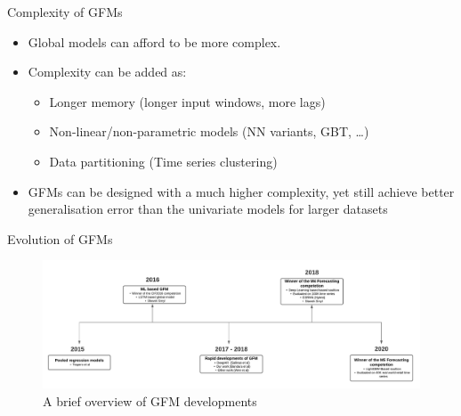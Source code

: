 \documentclass{beamer}
\begin{document}
 \begin{frame}{Complexity of GFMs}
  	\begin{itemize}
  	\item  Global models can afford to be more complex.
  	\vspace{2.0mm}	  
  	\item Complexity can be added as:
  	\begin{itemize}\color{blue}
		\item Longer memory (longer input windows, more lags)
		\item Non-linear/non-parametric models (NN variants, GBT, …)
		\item Data partitioning (Time series clustering)
	  \end{itemize}
	  \vspace{2.0mm}
	  \item GFMs can be designed with a much higher complexity, yet still achieve better generalisation error than the univariate models for larger datasets \cite{Montero-Manso2021-es}
 	\end{itemize}
   \end{frame}  
   
   
 \begin{frame}{Evolution of GFMs}
  	\begin{figure}
   \includegraphics[scale=0.35]{images/timeline}
   \caption{\tiny{A brief overview of GFM developments}}
  \end{figure}
  \end{frame}
  
\end{document}
